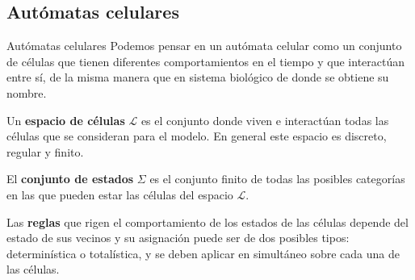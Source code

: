 \documentclass[9pt]{beamer}
\begin{document}
\subsection{Autómatas celulares}
\begin{frame}{Autómatas celulares}
Podemos pensar en un autómata celular como un conjunto de células que tienen diferentes comportamientos en el tiempo y que interactúan entre sí, de la misma manera que en sistema biológico de donde se obtiene su nombre.

Un \textbf{espacio de células} $\mathcal{L}$ es el conjunto donde viven e interactúan todas las células que se consideran para el modelo. En general este espacio es discreto, regular y finito.%

El \textbf{conjunto de estados} $\Sigma$ es el conjunto finito de todas las posibles categorías en las que pueden estar las células del espacio $\mathcal{L}$. %

Las \textbf{reglas} que rigen el comportamiento de los estados de las células depende del estado de sus vecinos y su asignación puede ser de dos posibles tipos: determinística o totalística, y se deben aplicar en simultáneo sobre cada una de las células.
\end{frame}
\end{document}
